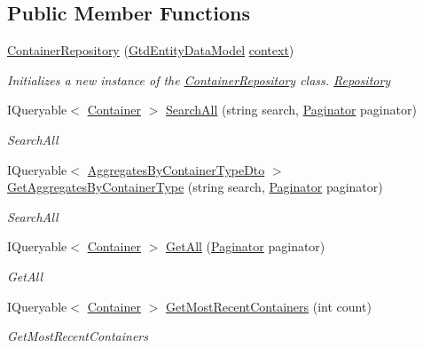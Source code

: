\subsection*{Public Member Functions}
\begin{DoxyCompactItemize}
\item 
\mbox{\hyperlink{class_gtd_app_1_1_repository_1_1_container_repository_a97d8e755e9fd9f4261dda2499737538e}{Container\+Repository}} (\mbox{\hyperlink{class_gtd_app_1_1_data_1_1_gtd_entity_data_model}{Gtd\+Entity\+Data\+Model}} \mbox{\hyperlink{class_gtd_app_1_1_repository_1_1_repository_a693057a1b8acd4c3778c183440feed41}{context}})
\begin{DoxyCompactList}\small\item\em Initializes a new instance of the \mbox{\hyperlink{class_gtd_app_1_1_repository_1_1_container_repository}{Container\+Repository}} class. \mbox{\hyperlink{class_gtd_app_1_1_repository_1_1_repository}{Repository}} \end{DoxyCompactList}\item 
I\+Queryable$<$ \mbox{\hyperlink{class_gtd_app_1_1_data_1_1_container}{Container}} $>$ \mbox{\hyperlink{class_gtd_app_1_1_repository_1_1_container_repository_a8bb337e076498a56737c6c6874fe5b98}{Search\+All}} (string search, \mbox{\hyperlink{class_gtd_app_1_1_repository_1_1_paginator}{Paginator}} paginator)
\begin{DoxyCompactList}\small\item\em Search\+All \end{DoxyCompactList}\item 
I\+Queryable$<$ \mbox{\hyperlink{class_gtd_app_1_1_data_1_1_dto_1_1_aggregates_by_container_type_dto}{Aggregates\+By\+Container\+Type\+Dto}} $>$ \mbox{\hyperlink{class_gtd_app_1_1_repository_1_1_container_repository_a85e135cbb1410eacad9a58039831b04c}{Get\+Aggregates\+By\+Container\+Type}} (string search, \mbox{\hyperlink{class_gtd_app_1_1_repository_1_1_paginator}{Paginator}} paginator)
\begin{DoxyCompactList}\small\item\em Search\+All \end{DoxyCompactList}\item 
I\+Queryable$<$ \mbox{\hyperlink{class_gtd_app_1_1_data_1_1_container}{Container}} $>$ \mbox{\hyperlink{class_gtd_app_1_1_repository_1_1_container_repository_a3ebd6e3082a59533e9053376c8e29f92}{Get\+All}} (\mbox{\hyperlink{class_gtd_app_1_1_repository_1_1_paginator}{Paginator}} paginator)
\begin{DoxyCompactList}\small\item\em Get\+All \end{DoxyCompactList}\item 
I\+Queryable$<$ \mbox{\hyperlink{class_gtd_app_1_1_data_1_1_container}{Container}} $>$ \mbox{\hyperlink{class_gtd_app_1_1_repository_1_1_container_repository_a3561741b8f76be818b48fdcd4d45c351}{Get\+Most\+Recent\+Containers}} (int count)
\begin{DoxyCompactList}\small\item\em Get\+Most\+Recent\+Containers \end{DoxyCompactList}\end{DoxyCompactItemize}
